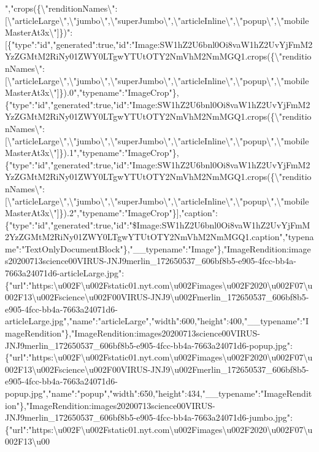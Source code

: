 ","crops(\{\textbackslash{}"renditionNames\textbackslash{}":{[}\textbackslash{}"articleLarge\textbackslash{}",\textbackslash{}"jumbo\textbackslash{}",\textbackslash{}"superJumbo\textbackslash{}",\textbackslash{}"articleInline\textbackslash{}",\textbackslash{}"popup\textbackslash{}",\textbackslash{}"mobileMasterAt3x\textbackslash{}"{]}\})":{[}\{"type":"id","generated":true,"id":"Image:SW1hZ2U6bnl0Oi8vaW1hZ2UvYjFmM2YzZGMtM2RiNy01ZWY0LTgwYTUtOTY2NmVhM2NmMGQ1.crops(\{\textbackslash{}"renditionNames\textbackslash{}":{[}\textbackslash{}"articleLarge\textbackslash{}",\textbackslash{}"jumbo\textbackslash{}",\textbackslash{}"superJumbo\textbackslash{}",\textbackslash{}"articleInline\textbackslash{}",\textbackslash{}"popup\textbackslash{}",\textbackslash{}"mobileMasterAt3x\textbackslash{}"{]}\}).0","typename":"ImageCrop"\},\{"type":"id","generated":true,"id":"Image:SW1hZ2U6bnl0Oi8vaW1hZ2UvYjFmM2YzZGMtM2RiNy01ZWY0LTgwYTUtOTY2NmVhM2NmMGQ1.crops(\{\textbackslash{}"renditionNames\textbackslash{}":{[}\textbackslash{}"articleLarge\textbackslash{}",\textbackslash{}"jumbo\textbackslash{}",\textbackslash{}"superJumbo\textbackslash{}",\textbackslash{}"articleInline\textbackslash{}",\textbackslash{}"popup\textbackslash{}",\textbackslash{}"mobileMasterAt3x\textbackslash{}"{]}\}).1","typename":"ImageCrop"\},\{"type":"id","generated":true,"id":"Image:SW1hZ2U6bnl0Oi8vaW1hZ2UvYjFmM2YzZGMtM2RiNy01ZWY0LTgwYTUtOTY2NmVhM2NmMGQ1.crops(\{\textbackslash{}"renditionNames\textbackslash{}":{[}\textbackslash{}"articleLarge\textbackslash{}",\textbackslash{}"jumbo\textbackslash{}",\textbackslash{}"superJumbo\textbackslash{}",\textbackslash{}"articleInline\textbackslash{}",\textbackslash{}"popup\textbackslash{}",\textbackslash{}"mobileMasterAt3x\textbackslash{}"{]}\}).2","typename":"ImageCrop"\}{]},"caption":\{"type":"id","generated":true,"id":"\$Image:SW1hZ2U6bnl0Oi8vaW1hZ2UvYjFmM2YzZGMtM2RiNy01ZWY0LTgwYTUtOTY2NmVhM2NmMGQ1.caption","typename":"TextOnlyDocumentBlock"\},"\_\_typename":"Image"\},"ImageRendition:images20200713science00VIRUS-JNJ9merlin\_172650537\_606bf8b5-e905-4fcc-bb4a-7663a24071d6-articleLarge.jpg":\{"url":"https:\textbackslash{}u002F\textbackslash{}u002Fstatic01.nyt.com\textbackslash{}u002Fimages\textbackslash{}u002F2020\textbackslash{}u002F07\textbackslash{}u002F13\textbackslash{}u002Fscience\textbackslash{}u002F00VIRUS-JNJ9\textbackslash{}u002Fmerlin\_172650537\_606bf8b5-e905-4fcc-bb4a-7663a24071d6-articleLarge.jpg","name":"articleLarge","width":600,"height":400,"\_\_typename":"ImageRendition"\},"ImageRendition:images20200713science00VIRUS-JNJ9merlin\_172650537\_606bf8b5-e905-4fcc-bb4a-7663a24071d6-popup.jpg":\{"url":"https:\textbackslash{}u002F\textbackslash{}u002Fstatic01.nyt.com\textbackslash{}u002Fimages\textbackslash{}u002F2020\textbackslash{}u002F07\textbackslash{}u002F13\textbackslash{}u002Fscience\textbackslash{}u002F00VIRUS-JNJ9\textbackslash{}u002Fmerlin\_172650537\_606bf8b5-e905-4fcc-bb4a-7663a24071d6-popup.jpg","name":"popup","width":650,"height":434,"\_\_typename":"ImageRendition"\},"ImageRendition:images20200713science00VIRUS-JNJ9merlin\_172650537\_606bf8b5-e905-4fcc-bb4a-7663a24071d6-jumbo.jpg":\{"url":"https:\textbackslash{}u002F\textbackslash{}u002Fstatic01.nyt.com\textbackslash{}u002Fimages\textbackslash{}u002F2020\textbackslash{}u002F07\textbackslash{}u002F13\textbackslash{}u00